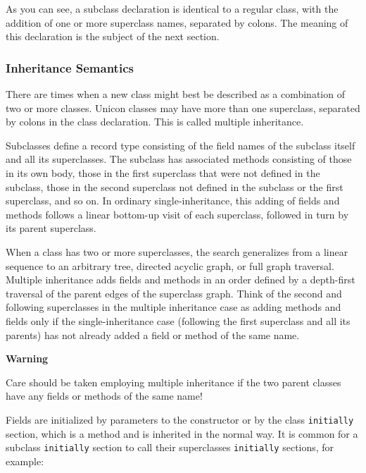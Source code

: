 As you can see, a subclass declaration is identical to a regular class,
with the addition of one or more superclass names, separated by colons.
The meaning of this declaration is the subject of the next section. 

\subsubsection[Inheritance Semantics]{Inheritance Semantics}

There are times when a new class might best
be described as a combination of two or more classes. Unicon classes
may have more than one superclass, separated by colons in the class
declaration. This is called multiple inheritance.

Subclasses define a record type consisting of the field names of the
subclass itself and all its superclasses. The subclass has associated
methods consisting of those in its own body, those in the first
superclass that were not defined in the subclass, those in the second
superclass not defined in the subclass or the first superclass, and so
on. In ordinary single-inheritance, this adding of fields and methods
follows a linear bottom-up visit of each superclass,
followed in turn by its parent superclass. 

When a class has two or more superclasses, the search generalizes from a
linear sequence to an arbitrary tree, directed acyclic
graph, or full graph traversal. 
Multiple inheritance adds fields and
methods in an order defined by a depth-first traversal of the parent
edges of the superclass graph. Think of the second and following
superclasses in the
multiple inheritance case as adding methods and fields only if the
single-inheritance case (following the first superclass and all its
parents) has not already added a field or method of the same name. 

{\sffamily\bfseries
Warning}

{\sffamily
Care should be taken employing multiple inheritance if the two parent
classes have any fields or methods of the same name! }

Fields are initialized by parameters to the constructor or by the
class \texttt{initially} section, which is a method and is
inherited in the normal way. It is common for a subclass \texttt{initially}
section to call their superclasses{\textquotesingle}
\texttt{initially} sections, for example:

